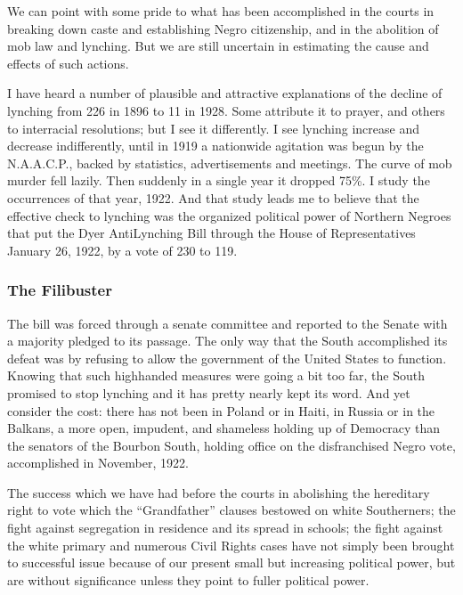 \documentclass[letterpaper,10pt,english]{jupyterBook}
\begin{document}
\sphinxAtStartPar
We can point with some pride to what has been accomplished in the courts in breaking down caste and establishing Negro citizenship, and in the abolition of mob law and lynching. But we are still uncertain in estimating the cause and effects of such actions.

\sphinxAtStartPar
I have heard a number of plausible and attractive explanations of the decline of lynching from 226 in 1896 to 11 in 1928. Some attribute it to prayer, and others to inter\sphinxhyphen{}racial resolutions; but I see it differently. I see lynching increase and decrease indifferently, until in 1919 a nationwide agitation was begun by the N.A.A.C.P., backed by statistics, advertisements and meetings. The curve of mob murder fell lazily. Then suddenly in a single year it dropped 75\%. I study the occurrences of that year, 1922. And that study leads me to believe that the effective check to lynching was the organized political power of Northern Negroes that put the Dyer Anti\sphinxhyphen{}Lynching Bill through the House of Representatives January 26, 1922, by a vote of 230 to 119.


\subsubsection{The Filibuster}
\label{\detokenize{Volumes/36/05/negro_citizen:the-filibuster}}
\sphinxAtStartPar
The bill was forced through a senate committee and reported to the Senate with a majority pledged to its passage. The only way that the South accomplished its defeat was by refusing to allow the government of the United States to function. Knowing that such high\sphinxhyphen{}handed measures were going a bit too far, the South promised to stop lynching and it has pretty nearly kept its word. And yet consider the cost: there has not been in Poland or in Haiti, in Russia or in the Balkans, a more open, impudent, and shameless holding up of Democracy than the senators of the Bourbon South, holding office on the disfranchised Negro vote, accomplished in November, 1922.

\sphinxAtStartPar
The success which we have had before the courts in abolishing the hereditary right to vote which the “Grandfather” clauses bestowed on white Southerners; the fight against segregation in residence and its spread in schools; the fight against the white primary and numerous Civil Rights cases have not simply been brought to successful issue because of our present small but increasing political power, but are without significance unless they point to fuller political power.
\end{document}
